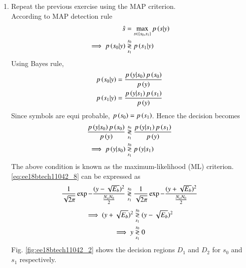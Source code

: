 \documentclass[journal,12pt,twocolumn]{IEEEtran}
\renewcommand\thesection{\arabic{section}}
\begin{document}
\begin{enumerate}[label=\thesection.\arabic*.,ref=\thesection.\theenumi]
\item
Repeat the previous exercise using the MAP criterion.
\\
\solution
According to MAP detection rule
\begin{align}
    \hat{s} &= \max_{s \in  \left\{s_0,s_1\right\}} p\left(s|y\right)
    \label{eq:ee18btech11042_3}
\\
    \implies p\left(s_0|y\right) &\overset{s_0}{\underset{s_1}{\gtrless}} p\left(s_1|y\right)
    \label{eq:ee18btech11042_4}
\end{align}
Using Bayes rule,
\begin{align}
    p\left(s_0|y\right) &= \frac{p\left(y|s_0\right)p\left(s_0\right)}{p\left(y\right)}
    \label{eq:ee18btech11042_5}
\\
    p\left(s_1|y\right) &= \frac{p\left(y|s_1\right)p\left(s_1\right)}{p\left(y\right)}
    \label{eq:ee18btech11042_6}
\end{align}
Since symbols are equi probable,  $p\left(s_0\right) =  p\left(s_1\right)$.  Hence the decision becomes
\begin{align}
    \frac{p\left(y|s_0\right)p\left(s_0\right)}{p\left(y\right)} &\overset{s_0}{\underset{s_1}{\gtrless}}  \frac{p\left(y|s_1\right)p\left(s_1\right)}{p\left(y\right)}
    \label{eq:ee18btech11042_7}
\\
    \implies p\left(y|s_0\right) &\overset{s_0}{\underset{s_1}{\gtrless}} p\left(y|s_1\right)
    \label{eq:ee18btech11042_8}
\end{align}
The above condition is known as the maximum-likelihood (ML) criterion.      \eqref{eq:ee18btech11042_8}
can be expressed as
{\small
\begin{align}
    \frac{1}{\sqrt{2\pi}} \exp{-\frac{(y-\sqrt{E_b})^2}{\frac{N_oN_0}{2}}}  \overset{s_0}{\underset{s_1}{\gtrless}}   
    \frac{1}{\sqrt{2\pi}} \exp{-\frac{(y+\sqrt{E_b})^2}{\frac{N_oN_0}{2}}}
    \label{eq:ee18btech11042_9}
\end{align}
}
\begin{align}
     \implies (y+\sqrt{E_b})^2 &\overset{s_0}{\underset{s_1}{\gtrless}} (y - \sqrt{E_b})^2
     \label{eq:ee18btech11042_10}
\\
    \implies y &\overset{s_0}{\underset{s_1}{\gtrless}} 0
    \label{eq:ee18btech11042_11}
\end{align}
Fig. \ref{fig:ee18btech11042_2} shows the decision regions $D_1$ and $D_2$ for $s_0$ and $s_1$ respectively.


\end{enumerate}
\end{document}
